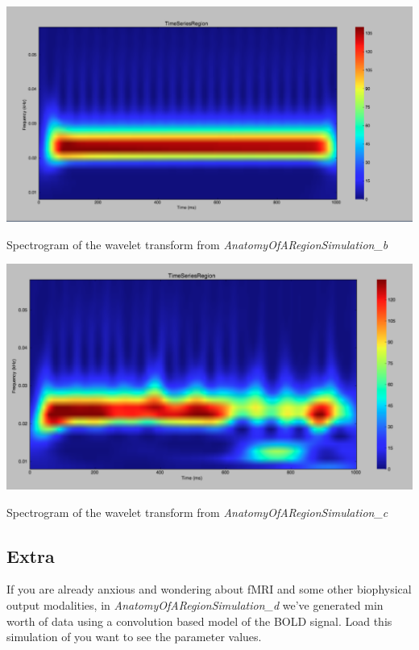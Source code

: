 \documentclass{tufte-handout}
\begin{document}
\begin{marginfigure}%
\includegraphics[width=\linewidth]{Handout_UI_BuildingYourOwnBrainNetworkModel_WaveletDeterministic}%
  \caption{Spectrogram of the wavelet transform from \textit{AnatomyOfARegionSimulation\_b}}%
  \label{fig:wavelet_deteministic}%
\end{marginfigure}
%
\begin{marginfigure}%
\includegraphics[width=\linewidth]{Handout_UI_BuildingYourOwnBrainNetworkModel_WaveletStochastic}%
  \caption{Spectrogram of the wavelet transform from \textit{AnatomyOfARegionSimulation\_c}}%
  \label{fig:wavelet_stochastic}%
\end{marginfigure}


\subsection{Extra}\label{sec:results}

If you are already anxious and wondering about fMRI and some other biophysical output modalities, in \textit{AnatomyOfARegionSimulation\_d} we've generated \unit[1]{min} worth of data using a convolution based model of the BOLD signal. Load this simulation of you want to see the parameter values.
\end{document}
